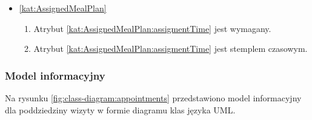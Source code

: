 \begin{itemize}[label={\textbf{Ograniczenia dla}}, wide, labelwidth=!, labelindent=0pt]
%

    \item\ref{kat:AssignedMealPlan}\mynobreakpar
    \begin{enumerate}[label={\textbf{OGR/5/\protect\twodigits{\arabic{enumi}}}}, wide, labelwidth=!, align=left, leftmargin=3cm, resume]
        \item Atrybut \ref{kat:AssignedMealPlan:assigmentTime} jest wymagany.

        \item Atrybut \ref{kat:AssignedMealPlan:assigmentTime} jest stemplem czasowym.
    \end{enumerate}
\end{itemize}

\subsubsection{Model informacyjny}\label{subsubsec:database:appointments:domainModel}

Na rysunku \ref{fig:class-diagram:appointments} przedstawiono model informacyjny dla poddziedziny wizyty w formie diagramu klas języka UML.


\thispagestyle{normal}
